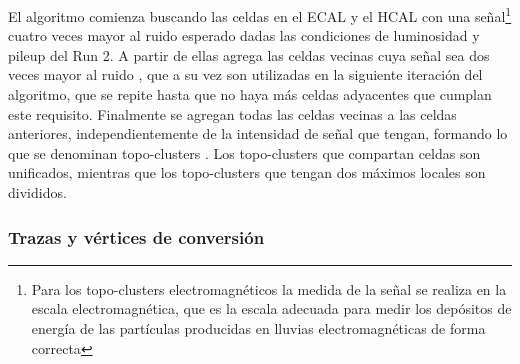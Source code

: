 El algoritmo comienza buscando las celdas en el ECAL y el HCAL con una señal\footnote{Para los topo-clusters electromagnéticos la medida de la señal se realiza en la escala electromagnética, que es la escala adecuada para medir los depósitos de energía de las partículas producidas en lluvias electromagnéticas de forma correcta} cuatro veces mayor al ruido esperado dadas las condiciones de luminosidad y pileup del Run 2. A partir de ellas agrega las celdas vecinas cuya señal sea dos veces mayor al ruido
, que a su vez son utilizadas en la siguiente iteración del algoritmo, que se repite hasta que no haya más celdas adyacentes que cumplan este requisito. Finalmente se agregan todas las celdas vecinas a las celdas anteriores, independientemente de la intensidad de señal que tengan, formando lo que se denominan topo-clusters \cite{PERF-2014-07, Lampl:1099735}. Los topo-clusters que compartan celdas son unificados, mientras que los topo-clusters que tengan dos máximos locales son divididos.


\subsubsection{Trazas y vértices de conversión}

